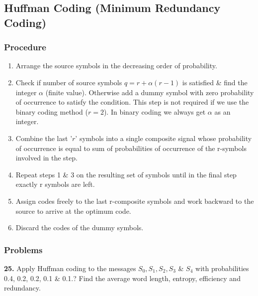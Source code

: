 \documentclass[12pt]{article}
\begin{document}
\subsection{Huffman Coding (Minimum Redundancy Coding)}
\subsubsection*{Procedure}
\begin{enumerate}
	\item Arrange the source symbols in the decreasing order of probability.
	\item Check if number of source symbols $q = r + \alpha(r-1)$ is satisfied \& find the integer $\alpha$ (finite value). Otherwise add a dummy symbol with zero probability of occurrence to satisfy the condition. This step is not required if we use the binary coding method ($r=2$). In binary coding we always get $\alpha$ as an integer.
	\item Combine the last '$r$' symbols into a single composite signal whose probability of occurrence is equal to sum of probabilities of occurrence of the r-symbols involved in the step.
	\item Repeat steps 1 \& 3 on the resulting set of symbols until in the final step exactly r symbols are left.
	\item Assign codes freely to the last r-composite symbols and work backward to the source to arrive at the optimum code.
	\item Discard the codes of the dummy symbols.
\end{enumerate}

\subsubsection*{Problems}

\textbf{25.} Apply Huffman coding to the messages $S_0, S_1, S_2, S_3$ \& $S_4$ with probabilities 0.4, 0.2, 0.2, 0.1 \& 0.1.? Find the average word length, entropy, efficiency and redundancy.
\end{document}
